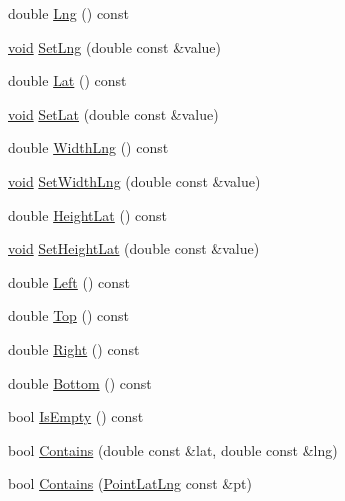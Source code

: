 \begin{DoxyCompactItemize}
\item 
double \hyperlink{group___o_p_map_widget_gae863985fa4b32d0a6f3d044068f2f35c}{\-Lng} () const 
\item 
\hyperlink{group___u_a_v_objects_plugin_ga444cf2ff3f0ecbe028adce838d373f5c}{void} \hyperlink{group___o_p_map_widget_ga4c18157580e77af2ee41044803503708}{\-Set\-Lng} (double const \&value)
\item 
double \hyperlink{group___o_p_map_widget_ga240d0cc702027ee4199ed6b4d9d7d91f}{\-Lat} () const 
\item 
\hyperlink{group___u_a_v_objects_plugin_ga444cf2ff3f0ecbe028adce838d373f5c}{void} \hyperlink{group___o_p_map_widget_ga456a709265c60dd74dfce1cbc473cc6c}{\-Set\-Lat} (double const \&value)
\item 
double \hyperlink{group___o_p_map_widget_ga4124280c2d4b4e103805d9cf5d3885bb}{\-Width\-Lng} () const 
\item 
\hyperlink{group___u_a_v_objects_plugin_ga444cf2ff3f0ecbe028adce838d373f5c}{void} \hyperlink{group___o_p_map_widget_gad64021f64974740e6d28a4c8481c3f74}{\-Set\-Width\-Lng} (double const \&value)
\item 
double \hyperlink{group___o_p_map_widget_gac283a070480139930c4a667981e4a0d4}{\-Height\-Lat} () const 
\item 
\hyperlink{group___u_a_v_objects_plugin_ga444cf2ff3f0ecbe028adce838d373f5c}{void} \hyperlink{group___o_p_map_widget_ga4e9a91453da6d9159491981c81f181e8}{\-Set\-Height\-Lat} (double const \&value)
\item 
double \hyperlink{group___o_p_map_widget_gaad643d7228be938282ad2c56a98cbc71}{\-Left} () const 
\item 
double \hyperlink{group___o_p_map_widget_ga1c2062c6fe46c3769c4e9a0d5eef59b8}{\-Top} () const 
\item 
double \hyperlink{group___o_p_map_widget_ga1a6604525748f3a62fb2e026bd5a4e9d}{\-Right} () const 
\item 
double \hyperlink{group___o_p_map_widget_ga56065ec26f127c4763bcb6002a1f4e23}{\-Bottom} () const 
\item 
bool \hyperlink{group___o_p_map_widget_ga4b7818f2eee94eb3c8ecb308da6a4c1b}{\-Is\-Empty} () const 
\item 
bool \hyperlink{group___o_p_map_widget_ga08c25e5064c11d63c96a89619f027b89}{\-Contains} (double const \&lat, double const \&lng)
\item 
bool \hyperlink{group___o_p_map_widget_ga15911b1ea5d85590ac05427410787b40}{\-Contains} (\hyperlink{structinternals_1_1_point_lat_lng}{\-Point\-Lat\-Lng} const \&pt)

\end{DoxyCompactItemize}
